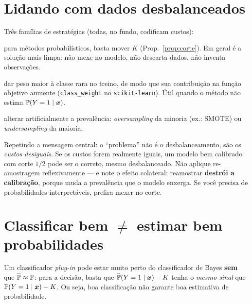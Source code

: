 \documentclass[11pt,a4paper]{article}
\begin{document}
\section{Lidando com dados desbalanceados}
Três famílias de estratégias (todas, no fundo, codificam custos):
\begin{description}[leftmargin=2.6cm,style=nextline]
  \item[Ajustar o corte] para métodos probabilísticos, basta mover $K$
        (Prop.~\ref{prop:corte}). Em geral é a solução mais limpa: não mexe no
        modelo, não descarta dados, não inventa observações.
  \item[Reponderar observações] dar peso maior à classe rara no treino, de modo que
        sua contribuição na função objetivo aumente (\texttt{class\_weight} no
        \texttt{scikit-learn}). Útil quando o método não estima $\mathbb{P}(Y=1\mid\bm{x})$.
  \item[Re-amostrar] alterar artificialmente a prevalência: \emph{oversampling} da
        minoria (ex.: SMOTE) ou \emph{undersampling} da maioria.
\end{description}

\begin{atencao}
Repetindo a mensagem central: o ``problema'' não é o desbalanceamento, são os
\emph{custos desiguais}. Se os custos forem realmente iguais, um modelo bem
calibrado com corte $1/2$ pode ser o correto, mesmo desbalanceado. Não aplique
re-amostragem reflexivamente --- e note o efeito colateral: reamostrar
\textbf{destrói a calibração}, porque muda a prevalência que o modelo enxerga. Se
você precisa de probabilidades interpretáveis, prefira mexer no corte.
\end{atencao}

\section{Classificar bem $\neq$ estimar bem probabilidades}
Um classificador \emph{plug-in} pode estar muito perto do classificador de Bayes
\textbf{sem} que $\widehat{\mathbb{P}}\approx\mathbb{P}$: para a decisão, basta que
$\widehat{\mathbb{P}}(Y=1\mid\bm{x})-K$ tenha o \emph{mesmo sinal} que
$\mathbb{P}(Y=1\mid\bm{x})-K$. Ou seja, boa classificação não garante boa estimativa de
probabilidade.
\end{document}
